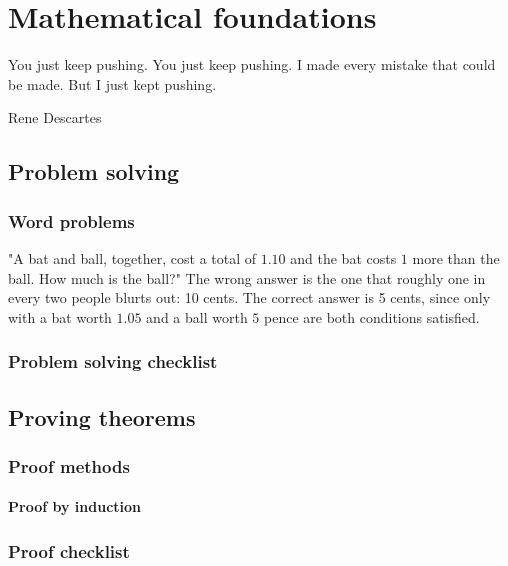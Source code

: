 \chapter{Mathematical foundations}

\epigraph{You just keep pushing. You just keep pushing. I made every mistake that could be made. But I just kept pushing.}{Rene Descartes}

\section{Problem solving}
\subsection{Word problems}
"A bat and ball, together, cost a total of $1.10$ and the bat costs $1$ more than the ball. How much is the ball?" The wrong answer is the one that roughly one in every two people blurts out: 10 cents. The correct answer is 5 cents, since only with a bat worth $1.05$ and a ball worth $5$ pence are both conditions satisfied.

\subsection{Problem solving checklist}

\section{Proving theorems}
\subsection{Proof methods}
\subsubsection{Proof by induction}
\subsection{Proof checklist}


